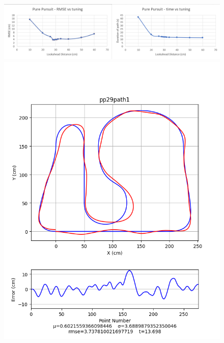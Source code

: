 \documentclass[12pt]{article}
\begin{document}
\begin{flushleft}
\begin{figure}[H]
\includegraphics[width=\linewidth]{images/tuningGraphs/pp}
\includegraphics[width=\linewidth]{images/pathData/pppath1}
\endminipage\hfill
{}

\end{figure}
\end{flushleft}
\end{document}
